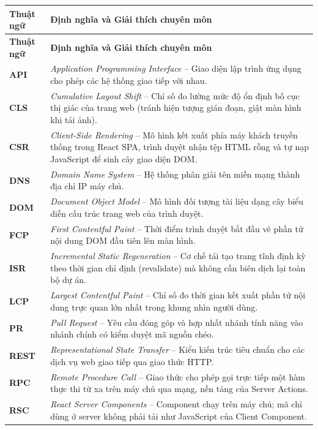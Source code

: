 \documentclass[12pt,a4paper]{extarticle}
\begin{document}
\begin{longtable}{>{\raggedright\arraybackslash}p{2.5cm}>{\raggedright\arraybackslash}p{12.0cm}}
\toprule
\textbf{Thuật ngữ} & \textbf{Định nghĩa và Giải thích chuyên môn} \\
\midrule
\endfirsthead
\toprule
\textbf{Thuật ngữ} & \textbf{Định nghĩa và Giải thích chuyên môn} \\
\midrule
\endhead
\bottomrule
\endfoot
\textbf{API} & \textit{Application Programming Interface} -- Giao diện lập trình ứng dụng cho phép các hệ thống giao tiếp với nhau. \\
\textbf{CLS} & \textit{Cumulative Layout Shift} -- Chỉ số đo lường mức độ ổn định bố cục thị giác của trang web (tránh hiện tượng gián đoạn, giật màn hình khi tải ảnh). \\
\textbf{CSR} & \textit{Client-Side Rendering} -- Mô hình kết xuất phía máy khách truyền thống trong React SPA, trình duyệt nhận tệp HTML rỗng và tự nạp JavaScript để sinh cây giao diện DOM. \\
\textbf{DNS} & \textit{Domain Name System} -- Hệ thống phân giải tên miền mạng thành địa chỉ IP máy chủ. \\
\textbf{DOM} & \textit{Document Object Model} -- Mô hình đối tượng tài liệu dạng cây biểu diễn cấu trúc trang web của trình duyệt. \\
\textbf{FCP} & \textit{First Contentful Paint} -- Thời điểm trình duyệt bắt đầu vẽ phần tử nội dung DOM đầu tiên lên màn hình. \\
\textbf{ISR} & \textit{Incremental Static Regeneration} -- Cơ chế tái tạo trang tĩnh định kỳ theo thời gian chỉ định (revalidate) mà không cần biên dịch lại toàn bộ dự án. \\
\textbf{LCP} & \textit{Largest Contentful Paint} -- Chỉ số đo thời gian kết xuất phần tử nội dung trực quan lớn nhất trong khung nhìn người dùng. \\
\textbf{PR} & \textit{Pull Request} -- Yêu cầu đóng góp và hợp nhất nhánh tính năng vào nhánh chính có kiểm duyệt mã nguồn chéo. \\
\textbf{REST} & \textit{Representational State Transfer} -- Kiểu kiến trúc tiêu chuẩn cho các dịch vụ web giao tiếp qua giao thức HTTP. \\
\textbf{RPC} & \textit{Remote Procedure Call} -- Giao thức cho phép gọi trực tiếp một hàm thực thi từ xa trên máy chủ qua mạng, nền tảng của Server Actions. \\
\textbf{RSC} & \textit{React Server Components} -- Component chạy trên máy chủ; mã chỉ dùng ở server không phải tải như JavaScript của Client Component. \\

\end{longtable}
\end{document}
